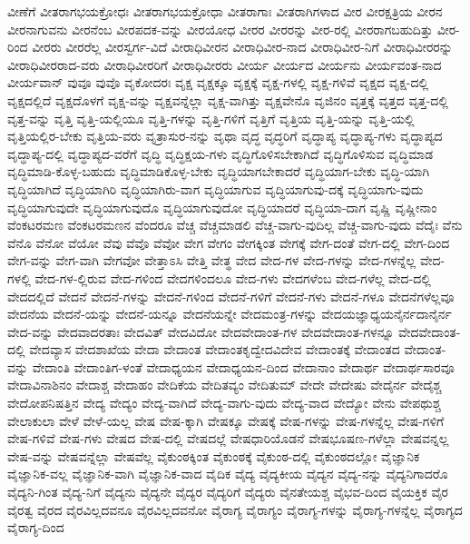 {ವೀಣೆಗೆ
ವೀತರಾಗಭಯಕ್ರೋಧಃ
ವೀತರಾಗಭಯಕ್ರೋಧಾ
ವೀತರಾಗಾಃ
ವೀತರಾಗಿಗಳಾದ
ವೀರ
ವೀರಕ್ಷತ್ರಿಯ
ವೀರನ
ವೀರನಾಗುವನು
ವೀರನೆಂಬ
ವೀರಪದಕ-ವನ್ನು
ವೀರಯೋಧ
ವೀರರ
ವೀರರನ್ನು
ವೀರ-ರಲ್ಲಿ
ವೀರರಾಗಬಹುದಿತ್ತು
ವೀರ-ರಿಂದ
ವೀರರು
ವೀರರೆಲ್ಲ
ವೀರಸ್ವರ್ಗ-ವಿದೆ
ವೀರಾಧಿವೀರನ
ವೀರಾಧಿವೀರ-ನಾದ
ವೀರಾಧಿವೀರ-ನಿಗೆ
ವೀರಾಧಿವೀರರನ್ನು
ವೀರಾಧಿವೀರರಾದ-ವರು
ವೀರಾಧಿವೀರರಿಗೆ
ವೀರಾಧಿವೀರರು
ವೀರ್ಯ
ವೀರ್ಯದ
ವೀರ್ಯನು
ವೀರ್ಯವಂತ-ನಾದ
ವೀರ್ಯವಾನ್
ವುವೂ
ವುವೊ
ವೃಕೋದರಃ
ವೃಕ್ಷ
ವೃಕ್ಷಕ್ಕೂ
ವೃಕ್ಷಕ್ಕೆ
ವೃಕ್ಷ-ಗಳಲ್ಲಿ
ವೃಕ್ಷ-ಗಳಿವೆ
ವೃಕ್ಷದ
ವೃಕ್ಷ-ದಲ್ಲಿ
ವೃಕ್ಷದಲ್ಲಿದೆ
ವೃಕ್ಷದೊಳಗೆ
ವೃಕ್ಷ-ವನ್ನು
ವೃಕ್ಷವನ್ನೆಲ್ಲಾ
ವೃಕ್ಷ-ವಾಗಿತ್ತು
ವೃಕ್ಷವೇನೊ
ವೃಜಿನಂ
ವೃತ್ತಕ್ಕೆ
ವೃತ್ತದ
ವೃತ್ತ-ದಲ್ಲಿ
ವೃತ್ತ-ವನ್ನು
ವೃತ್ತಿ
ವೃತ್ತಿ-ಯಲ್ಲಿಯೂ
ವೃತ್ತಿ-ಗಳನ್ನು
ವೃತ್ತಿ-ಗಳಿಗೆ
ವೃತ್ತಿಗೆ
ವೃತ್ತಿಯ
ವೃತ್ತಿ-ಯನ್ನು
ವೃತ್ತಿ-ಯಲ್ಲಿ
ವೃತ್ತಿಯಲ್ಲಿರ-ಬೇಕು
ವೃತ್ತಿಯ-ವರು
ವೃತ್ರಾಸುರ-ನನ್ನು
ವೃಥಾ
ವೃದ್ಧ
ವೃದ್ಧರಿಗೆ
ವೃದ್ಧಾಪ್ಯ
ವೃದ್ಧಾಪ್ಯ-ಗಳು
ವೃದ್ಧಾಪ್ಯದ
ವೃದ್ಧಾಪ್ಯ-ದಲ್ಲಿ
ವೃದ್ಧಾಪ್ಯದ-ವರೆಗೆ
ವೃದ್ಧಿ
ವೃದ್ಧಿಕ್ಷಯ-ಗಳು
ವೃದ್ಧಿಗೊಳಿಸಬೇಕಾಗಿದೆ
ವೃದ್ಧಿಗೊಳಿಸುವ
ವೃದ್ಧಿಮಾಡ
ವೃದ್ಧಿಮಾಡಿ-ಕೊಳ್ಳ-ಬಹುದು
ವೃದ್ಧಿಮಾಡಿಕೊಳ್ಳ-ಬೇಕು
ವೃದ್ಧಿಯಾಗಬೇಕಾದರೆ
ವೃದ್ಧಿಯಾಗ-ಬೇಕು
ವೃದ್ಧಿ-ಯಾಗಿ
ವೃದ್ಧಿಯಾಗಿದೆ
ವೃದ್ಧಿಯಾಗಿರಿ
ವೃದ್ಧಿಯಾಗಿರು-ವಾಗ
ವೃದ್ಧಿಯಾಗುವ
ವೃದ್ಧಿಯಾಗುವು-ದಕ್ಕೆ
ವೃದ್ಧಿಯಾಗು-ವುದು
ವೃದ್ಧಿಯಾಗುವುದೇ
ವೃದ್ಧಿಯಾಗುವುದೊ
ವೃದ್ಧಿಯಾಗುವುದೋ
ವೃದ್ಧಿಯಾದರೆ
ವೃದ್ಧಿಯಾ-ದಾಗ
ವೃಷ್ಣಿ
ವೃಷ್ಣೀನಾಂ
ವೆಂಕಟರಮಣ
ವೆಂಕಟರಮಣನ
ವೆಂದರೂ
ವೆಚ್ಚ
ವೆಚ್ಚಮಾಡಲಿ
ವೆಚ್ಚ-ವಾಗು-ವುದಿಲ್ಲ
ವೆಚ್ಚ-ವಾಗು-ವುದು
ವೆದೈಃ
ವೆನು
ವೆನೊ
ವೆನೋ
ವೆಯೋ
ವೆವು
ವೆವೊ
ವೆವೋ
ವೇಗ
ವೇಗಂ
ವೇಗಕ್ಕಿಂತ
ವೇಗಕ್ಕೆ
ವೇಗ-ದಂತೆ
ವೇಗ-ದಲ್ಲಿ
ವೇಗ-ದಿಂದ
ವೇಗ-ವನ್ನು
ವೇಗ-ವಾಗಿ
ವೇಗವೋ
ವೇತ್ತಾಽಸಿ
ವೇತ್ತಿ
ವೇತ್ಥ
ವೇದ
ವೇದ-ಗಳ
ವೇದ-ಗಳನ್ನು
ವೇದ-ಗಳನ್ನೆಲ್ಲ
ವೇದ-ಗಳಲ್ಲಿ
ವೇದ-ಗಳ-ಲ್ಲಿರುವ
ವೇದ-ಗಳಿಂದ
ವೇದಗಳಿಂದಲೂ
ವೇದ-ಗಳು
ವೇದಗಳೆಂಬ
ವೇದ-ಗಳೆಲ್ಲ
ವೇದ-ದಲ್ಲಿ
ವೇದದಲ್ಲಿದೆ
ವೇದನೆ
ವೇದನೆ-ಗಳನ್ನು
ವೇದನೆ-ಗಳಿಂದ
ವೇದನೆ-ಗಳಿಗೆ
ವೇದನೆ-ಗಳು
ವೇದನೆ-ಗಳೂ
ವೇದನೆಗಳೆಲ್ಲವೂ
ವೇದನೆಯ
ವೇದನೆ-ಯನ್ನು
ವೇದನೆ-ಯನ್ನೂ
ವೇದನೆಯನ್ನೇ
ವೇದಮಂತ್ರ-ಗಳನ್ನು
ವೇದಯಜ್ಞಾಧ್ಯಯನೈರ್ನದಾನೈರ್ನ
ವೇದ-ವನ್ನು
ವೇದವಾದರತಾಃ
ವೇದವಿತ್
ವೇದವಿದೋ
ವೇದವೇದಾಂತ-ಗಳ
ವೇದವೇದಾಂತ-ಗಳನ್ನೂ
ವೇದವೇದಾಂತ-ದಲ್ಲಿ
ವೇದವ್ಯಾಸ
ವೇದಶಾಖೆಯ
ವೇದಾ
ವೇದಾಂತ
ವೇದಾಂತಕೃದ್ವೇದವಿದೇವ
ವೇದಾಂತಕ್ಕೆ
ವೇದಾಂತದ
ವೇದಾಂತ-ವನ್ನು
ವೇದಾಂತಿ
ವೇದಾಂತಿಗ-ಳಂತೆ
ವೇದಾಧ್ಯಯನ
ವೇದಾಧ್ಯಯನ-ದಿಂದ
ವೇದಾನಾಂ
ವೇದಾರ್ಥ
ವೇದಾರ್ಥಸಾರವೂ
ವೇದಾವಿನಾಶಿನಂ
ವೇದಾಶ್ಚ
ವೇದಾಹಂ
ವೇದಿಕೆಯ
ವೇದಿತವ್ಯಂ
ವೇದಿತುಮ್
ವೇದೇ
ವೇದೇಷು
ವೇದೈರ್ನ
ವೇದೈಶ್ಚ
ವೇದೋಪನಿಷತ್ತಿನ
ವೇದ್ಯ
ವೇದ್ಯಂ
ವೇದ್ಯ-ವಾಗಿದೆ
ವೇದ್ಯ-ವಾಗು-ವುದು
ವೇದ್ಯ-ವಾದ
ವೇದ್ಯೋ
ವೇನು
ವೇಪಥುಶ್ಚ
ವೇಲಾಕುಲಾ
ವೇಳೆ
ವೇಳೆ-ಯಲ್ಲ
ವೇಷ
ವೇಷ-ಕ್ಕಾಗಿ
ವೇಷಕ್ಕೂ
ವೇಷಕ್ಕೆ
ವೇಷ-ಗಳನ್ನು
ವೇಷ-ಗಳನ್ನೆಲ್ಲ
ವೇಷ-ಗಳಿಗೆ
ವೇಷ-ಗಳಿವೆ
ವೇಷ-ಗಳು
ವೇಷದ
ವೇಷ-ದಲ್ಲಿ
ವೇಷದಲ್ಲೆ
ವೇಷಧಾರಿಯೊಡನೆ
ವೇಷಭೂಷಣ-ಗಳೆಲ್ಲಾ
ವೇಷವನ್ನಲ್ಲ
ವೇಷ-ವನ್ನು
ವೇಷವನ್ನೆಲ್ಲಾ
ವೇಷವೆಲ್ಲ
ವೈಕುಂಠಕ್ಕಿಂತ
ವೈಕುಂಠಕ್ಕೆ
ವೈಕುಂಠ-ದಲ್ಲಿ
ವೈಕುಂಠದಲ್ಲೋ
ವೈಜ್ಞಾನಿಕ
ವೈಜ್ಞಾನಿಕ-ವಲ್ಲ
ವೈಜ್ಞಾನಿಕ-ವಾಗಿ
ವೈಜ್ಞಾನಿಕ-ವಾದ
ವೈದಿಕ
ವೈದ್ಯ
ವೈದ್ಯಕೀಯ
ವೈದ್ಯನ
ವೈದ್ಯ-ನನ್ನು
ವೈದ್ಯನಿಗಾದರೊ
ವೈದ್ಯನಿ-ಗಿಂತ
ವೈದ್ಯ-ನಿಗೆ
ವೈದ್ಯನು
ವೈದ್ಯನೇ
ವೈದ್ಯರ
ವೈದ್ಯರಿಗೆ
ವೈದ್ಯರು
ವೈನತೇಯಶ್ಚ
ವೈಭವ-ದಿಂದ
ವೈಯಕ್ತಿಕ
ವೈರ
ವೈರತ್ವ
ವೈರದ
ವೈರವಿಲ್ಲದವನೂ
ವೈರವಿಲ್ಲದವನೋ
ವೈರಾಗ್ಯ
ವೈರಾಗ್ಯಂ
ವೈರಾಗ್ಯ-ಗಳನ್ನು
ವೈರಾಗ್ಯ-ಗಳನ್ನೆಲ್ಲ
ವೈರಾಗ್ಯದ
ವೈರಾಗ್ಯ-ದಿಂದ
}
